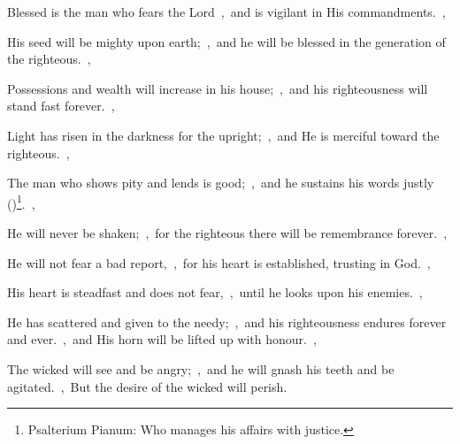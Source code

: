 \documentclass[12pt,twoside,a5paper]{article}
\begin{document}





\begin{normalparskip}
  Blessed is the man who fears the Lord~\sep\ and is vigilant in His commandments.~\sep


  His seed will be mighty upon earth;~\sep\ and he will be blessed in the generation of the righteous.~\sep

  Possessions and wealth will increase in his house;~\sep\ and his righteousness will stand fast forever.~\sep

  Light has risen in the darkness for the upright;~\sep\ and He is merciful toward the righteous.~\sep

  The man who shows pity and lends is good;~\sep\ and he sustains his words justly ()\footnote{Psalterium Pianum: Who manages his affairs with justice.}.~\sep

  He will never be shaken;~\sep\ for the righteous there will be remembrance forever.~\sep

  He will not fear a bad report,~\sep\ for his heart is established, trusting in God.~\sep

  His heart is steadfast and does not fear,~\sep\ until he looks upon his enemies.~\sep

  He has scattered and given to the needy;~\sep\ and his righteousness endures forever and ever.~\sep\ and His horn will be lifted up with honour.~\sep

  The wicked will see and be angry;~\sep\ and he will gnash his teeth and be agitated.~\sep\ But the desire of the wicked will perish.
\end{normalparskip}

\end{document}
